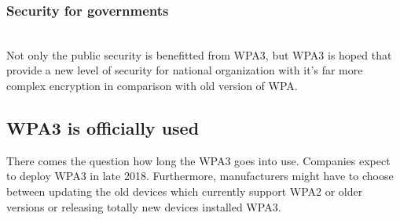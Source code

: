 \subsubsection{Security for governments}~\\
Not only the public security is benefitted from WPA3, but WPA3 is hoped that provide a new level of security for national organization with it’s far more complex encryption in comparison with old version of WPA.
\subsection{WPA3 is officially used }
There comes the question how long the WPA3 goes into use. Companies expect to deploy WPA3 in late 2018. Furthermore, manufacturers might have to choose between updating the old devices which currently support WPA2 or older versions or releasing totally new devices installed WPA3.